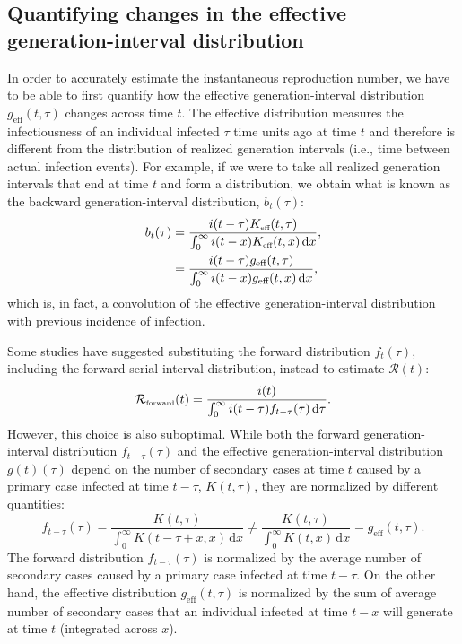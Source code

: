 \documentclass[12pt]{article}
\newcommand{\RR}{\ensuremath{{\mathcal R}}\xspace}
\newcommand{\tsub}[2]{#1_{{\textrm{\tiny #2}}}}
\newcommand{\dd}[1]{\ensuremath{\, \mathrm{d}#1}}
\newcommand{\dtau}{\dd{\tau}}
\newcommand{\dx}{\dd{x}}
\newcommand{\Keff}{\ensuremath{\tsub{K}{eff}}\xspace}
\newcommand{\geff}{g_{\textrm{eff}}} %
\begin{document}
\subsection{Quantifying changes in the effective generation-interval distribution}

In order to accurately estimate the instantaneous reproduction number, we have to be able to first quantify how the effective generation-interval distribution $\geff(t, \tau)$ changes across time $t$.
The effective distribution measures the infectiousness of an individual infected $\tau$ time units ago at time $t$ and therefore is different from the distribution of realized generation intervals (i.e., time between actual infection events).
For example, if we were to take all realized generation intervals that end at time $t$ and form a distribution, we obtain what is known as the backward generation-interval distribution, $b_t(\tau)$:
\begin{align}
b_t(\tau) &= \frac{i(t-\tau) \Keff(t,\tau)}{\int_0^\infty i(t-x) \Keff(t,x) \dx},\\
&= \frac{i(t-\tau) \geff(t,\tau)}{\int_0^\infty i(t-x) \geff(t,x) \dx},
\end{align}
which is, in fact, a convolution of the effective generation-interval distribution with previous incidence of infection.

Some studies have suggested substituting the forward distribution $f_t(\tau)$, including the forward serial-interval distribution, instead to estimate $\RR(t)$:
\begin{equation}
\tsub{\RR}{forward}(t) = \frac{i(t)}{\int_0^\infty i(t-\tau) f_{t-\tau}(\tau) \dtau}.
\end{equation}
However, this choice is also suboptimal.
While both the forward generation-interval distribution $f_{t-\tau}(\tau)$ and the effective generation-interval distribution $g(t)(\tau)$ depend on the number of secondary cases at time $t$ caused by a primary case infected at time $t-\tau$, $K(t, \tau)$, they are normalized by different quantities:
\begin{equation}
f_{t-\tau}(\tau) = \frac{K(t,\tau)}{\int_0^\infty K(t-\tau+x,x) \dx} \neq \frac{K(t,\tau)}{\int_0^\infty K(t,x) \dx} = \geff(t, \tau).
\end{equation}
The forward distribution $f_{t-\tau}(\tau)$ is normalized by the average number of secondary cases caused by a primary case infected at time $t-\tau$.
On the other hand, the effective distribution $\geff(t, \tau)$ is normalized by the sum of average number of secondary cases that an individual infected at time $t-x$ will generate at time $t$ (integrated across $x$).
\end{document}
